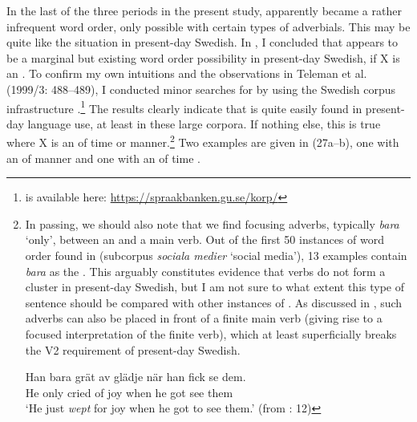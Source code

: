 \documentclass[output=paper, colorlinks, citecolor=brown]{langscibook}
\begin{document}
In the last of the three  periods in the present study,  apparently became a rather infrequent word order, only possible with certain types of adverbials. This may be quite like the situation in present-day Swedish. In , I concluded that  appears to be a marginal but existing word order possibility in present-day Swedish, if X is an . To confirm my own intuitions and the observations in Teleman et al. (1999/3: 488–489), I conducted minor searches for  by using the Swedish corpus infrastructure  \citep{BorinEtAl2012}.\footnote{ is available here: \url{https://spraakbanken.gu.se/korp/}}  The results clearly indicate that  is quite easily found in present-day language use, at least in these large corpora. If nothing else, this is true where X is an  of time or manner.{\footnote{In passing, we should also note that we find focusing adverbs, typically \textit{bara} ‘only’, between an  and a main verb. Out of the first 50 instances of  word order found in  (subcorpus \textit{sociala medier} ‘social media’), 13 examples contain \textit{bara} as the . This arguably constitutes evidence that verbs do not form a cluster in present-day Swedish, but I am not sure to what extent this type of sentence should be compared with other instances of . As discussed in \citet{BrandtlerHakansson2017}, such adverbs can also be placed in front of a finite main verb (giving rise to a focused interpretation of the finite verb), which at least superficially breaks the V2 requirement of present-day Swedish.   

\ea
\gll  Han  bara  grät  av  glädje  när  han  fick  se  dem.\\
      He  only  cried  of  joy  when  he  got  see  them\\
\glt ‘He just \textit{wept} for joy when he got to see them.’ (from \citealt{BrandtlerHakansson2017}: 12)
\z}} Two examples are given in (27a–b), one with an  of manner  and one with an  of time .
\end{document}
